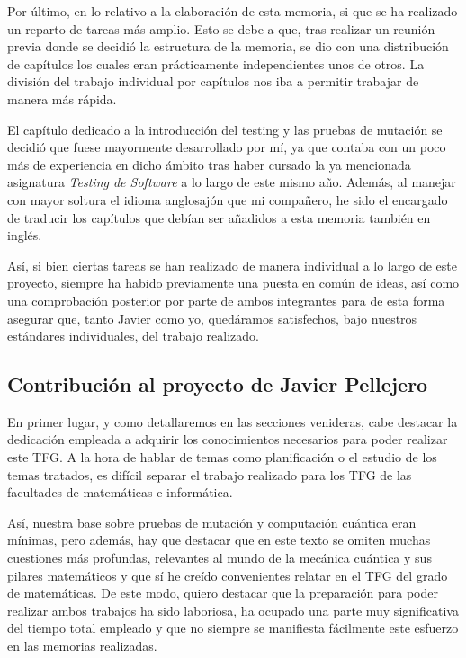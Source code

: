 Por último, en lo relativo a la elaboración de esta memoria, si que se ha realizado un reparto de tareas más amplio. Esto se debe a que, tras realizar un reunión previa donde se decidió la estructura de la memoria, se dio con una distribución de capítulos los cuales eran prácticamente independientes unos de otros. La división del trabajo individual por capítulos nos iba a permitir trabajar de manera más rápida. 

El capítulo dedicado a la introducción del testing y las pruebas de mutación se decidió que fuese mayormente desarrollado por mí, ya que contaba con un poco más de experiencia en dicho ámbito tras haber cursado la ya mencionada asignatura \textit{Testing de Software} a lo largo de este mismo año. Además, al manejar con mayor soltura el idioma anglosajón que mi compañero, he sido el encargado de traducir los capítulos que debían ser añadidos a esta memoria también en inglés.

Así, si bien ciertas tareas se han realizado de manera individual a lo largo de este proyecto, siempre ha habido previamente una puesta en común de ideas, así como una comprobación posterior por parte de ambos integrantes para de esta forma asegurar que, tanto Javier como yo, quedáramos satisfechos, bajo nuestros estándares individuales, del trabajo realizado.

\subsection{Contribución al proyecto de Javier Pellejero}

En primer lugar, y como detallaremos en las secciones venideras, cabe destacar la dedicación empleada a adquirir los conocimientos necesarios para poder realizar este TFG. A la hora de hablar de temas como planificación o el estudio de los temas tratados, es difícil separar el trabajo realizado para los TFG de las facultades de matemáticas e informática.

Así, nuestra base sobre pruebas de mutación y computación cuántica eran mínimas, pero además, hay que destacar que en este texto se omiten muchas cuestiones más profundas, relevantes al mundo de la mecánica cuántica y sus pilares matemáticos y que sí he creído convenientes relatar en el TFG del grado de matemáticas. De este modo, quiero destacar que la preparación para poder realizar ambos trabajos ha sido laboriosa, ha ocupado una parte muy significativa del tiempo total empleado y que no siempre se manifiesta fácilmente este esfuerzo en las memorias realizadas.

